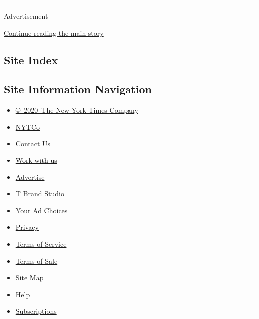\begin{center}\rule{0.5\linewidth}{\linethickness}\end{center}

Advertisement

\protect\hyperlink{after-bottom}{Continue reading the main story}

\hypertarget{site-index}{%
\subsection{Site Index}\label{site-index}}

\hypertarget{site-information-navigation}{%
\subsection{Site Information
Navigation}\label{site-information-navigation}}

\begin{itemize}
\tightlist
\item
  \href{https://help.nytimes.com/hc/en-us/articles/115014792127-Copyright-notice}{©~2020~The
  New York Times Company}
\end{itemize}

\begin{itemize}
\tightlist
\item
  \href{https://www.nytco.com/}{NYTCo}
\item
  \href{https://help.nytimes.com/hc/en-us/articles/115015385887-Contact-Us}{Contact
  Us}
\item
  \href{https://www.nytco.com/careers/}{Work with us}
\item
  \href{https://nytmediakit.com/}{Advertise}
\item
  \href{http://www.tbrandstudio.com/}{T Brand Studio}
\item
  \href{https://www.nytimes.com/privacy/cookie-policy\#how-do-i-manage-trackers}{Your
  Ad Choices}
\item
  \href{https://www.nytimes.com/privacy}{Privacy}
\item
  \href{https://help.nytimes.com/hc/en-us/articles/115014893428-Terms-of-service}{Terms
  of Service}
\item
  \href{https://help.nytimes.com/hc/en-us/articles/115014893968-Terms-of-sale}{Terms
  of Sale}
\item
  \href{https://spiderbites.nytimes.com}{Site Map}
\item
  \href{https://help.nytimes.com/hc/en-us}{Help}
\item
  \href{https://www.nytimes.com/subscription?campaignId=37WXW}{Subscriptions}
\end{itemize}

